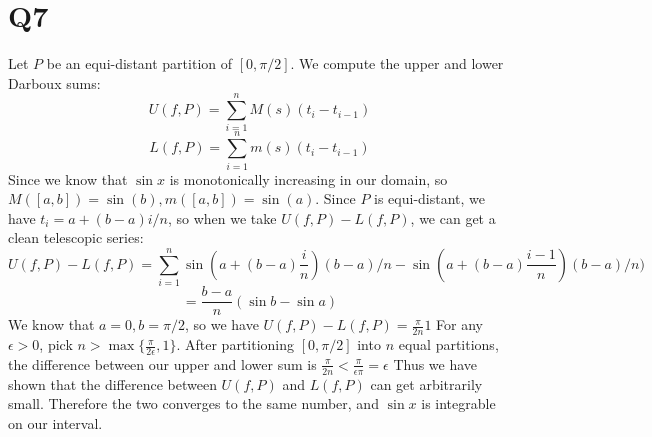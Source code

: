 \documentclass[12pt]{article}
\begin{document}
\section{Q7}
Let $P$ be an equi-distant partition of $[0, \pi/2]$. We compute the upper and lower Darboux sums:
$$U(f, P) = \sum_{i=1}^n M(s)(t_i-t_{i-1})$$
$$L(f, P) = \sum_{i=1}^n m(s)(t_i-t_{i-1})$$
Since we know that $\sin x$ is monotonically increasing in our domain, so $M([a,b]) = \sin(b), m([a,b]) = \sin(a)$.
\newline
Since $P$ is equi-distant, we have $t_i = a + (b-a)i/n$, so when we take $U(f,P)-L(f,P)$, we can get a clean telescopic series:
$$U(f,P)-L(f,P) = \sum_{i=1}^n \sin(a + (b-a)\frac{i}{n})(b-a)/n - \sin(a + (b-a)\frac{i-1}{n})(b-a)/n)$$
$$= \frac{b-a}{n}(\sin b - \sin a)$$
We know that $a=0, b = \pi/2$, so we have $U(f,P)-L(f,P) = \frac{\pi}{2n}1$
\newline
For any $\epsilon > 0$, pick $n > \max \{\frac{\pi}{2\epsilon}, 1\}$. After partitioning $[0, \pi/2]$ into $n$ equal partitions, the difference between our upper and lower sum is $\frac{\pi}{2n} < \frac{\pi}{\epsilon \pi} = \epsilon$
Thus we have shown that the difference between $U(f,P)$ and $L(f,P)$ can get arbitrarily small. Therefore the two converges to the same number, and $\sin x$ is integrable on our interval.
\end{document}
